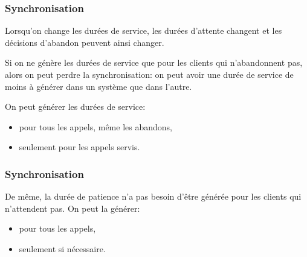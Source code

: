 \documentclass[t,usepdftitle=false]{beamer}
\begin{document}
\begin{frame}
	\frametitle{Synchronisation}
	
	Lorsqu'on change les durées de service, les durées d'attente changent
	et les décisions d'abandon peuvent ainsi changer.
	
	\mbox{}
	
	Si on ne génère les durées de service que pour les clients qui 
	n'abandonnent pas, alors on peut perdre la synchronisation:
	on peut avoir une durée de service de moins \`a générer dans 
	un système que dans l'autre.
	
	\mbox{}
	
	On peut générer les durées de service:
	\begin{itemize}
		\item[(a)] 
		pour tous les appels, m\^eme les abandons,
		\item[(b)] 
		seulement pour les appels servis.
	\end{itemize}
	
\end{frame}

\begin{frame}
	\frametitle{Synchronisation}
	
	De m\^eme, la durée de patience n'a pas besoin d'\^etre générée pour 
	les clients qui n'attendent pas.  On peut la générer:
	\begin{itemize}
		\item[(c)] 
		pour tous les appels,
		\item[(d)] 
		seulement si nécessaire.
	\end{itemize}
	
\end{frame}
\end{document}
